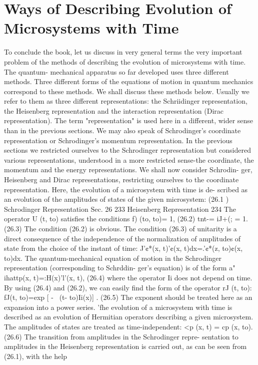 \documentclass[a4paper,sfsidenotes,colorlinks=true]{tufte-book}
\numberwithin{equation}{section}
\numberwithin{figure}{section}
\begin{document}
{{{{{{\section{Ways of Describing Evolution of Microsystems with Time}
To conclude the book, let us discuss in very general terms the very important problem of the methods of describing the evolution of microsystems with time. The quantum- mechanical apparatus so far developed uses three different methods. Three different forms of the equations of motion in quantum mechanics correspond to these methods. We shall discuss these methods below. Usually we refer to them as three different representations: the Schriidinger representation, the Heisenberg representation and the interaction representation (Dirac representation). The term "representation" is used here in a different, wider sense than in the previous sections. We may also speak of Schrodinger's coordinate representation or Schrodinger's momentum representation. In the previous sections we restricted ourselves to the Schrodinger representation but considered various representations, understood in a more restricted sense-the coordinate, the momentum and the energy representations. We shall now consider Schrodin- ger, Heisenberg and Dirac representations, restricting ourselves to the coordinate representation.
Here, the evolution of a microsystem with time is de- scribed as an evolution of the amplitudes of states of the given microsystem:
(26.1 )
Schrodinger Representation
Sec. 26
233
Heisenberg Representation
234
The operator U (t, to) satisfies the conditions f) (to, to)= 1,	(26.2) tnt-= iJ+(; =	1.	(26.3)
The condition (26.2) is obvious. The condition (26.3) of unitarity is a direct consequence of the independence of the normalization of amplitudes of state from the choice of the instant of time:
J'¢*(x, t)'¢(x, t)dx=.'¢*(z, to)¢(x, to)dx.
The quantum-mechanical equation of motion in the Schrodinger representation (corresponding to Schrddin- ger's equation) is of the form
a" ihattp(x, t)=:H(x)'l'(x, t),	(26.4)
where the operator Ii does not depend on time. By using (26.4) and (26.2), we can easily find the form of the
operator	rJ (t,	to): fJ(t, to)=exp [ - ~(t- to)Ii(x)] .	(26.5)
The exponent should be treated here as an expansion into a power series.
'fhe evolution of a microsystem with time is described as an evolution of Hermitian operators describing a given microsystem. The amplitudes of states are treated as time-independent:
<p (x, t) = cp (x, to).	(26.6)
The transition from amplitudes in the Schrodinger repre- sentation to amplitudes in the Heisenberg representation is carried out, as can be seen from (26.1), with the help
}}}}}}
\end{document}
